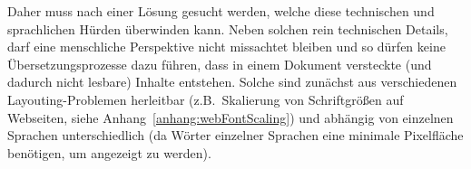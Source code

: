 Daher muss nach einer Lösung gesucht werden, welche diese technischen und sprachlichen Hürden überwinden kann. Neben solchen rein technischen Details, darf eine menschliche Perspektive nicht missachtet bleiben und so dürfen keine Übersetzungsprozesse dazu führen, dass in einem Dokument versteckte (und dadurch nicht lesbare) Inhalte entstehen. Solche sind zunächst aus verschiedenen Layouting-Problemen herleitbar (z.B.\ Skalierung von Schriftgrößen auf Webseiten, siehe Anhang~\ref{anhang:webFontScaling}) und abhängig von einzelnen Sprachen unterschiedlich (da Wörter einzelner Sprachen eine minimale Pixelfläche benötigen, um angezeigt zu werden).%



%


